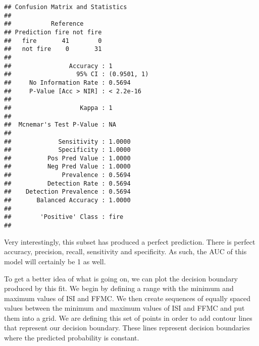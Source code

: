 \documentclass[
]{article}
\begin{document}
\begin{verbatim}
## Confusion Matrix and Statistics
## 
##           Reference
## Prediction fire not fire
##   fire       41        0
##   not fire    0       31
##                                      
##                Accuracy : 1          
##                  95% CI : (0.9501, 1)
##     No Information Rate : 0.5694     
##     P-Value [Acc > NIR] : < 2.2e-16  
##                                      
##                   Kappa : 1          
##                                      
##  Mcnemar's Test P-Value : NA         
##                                      
##             Sensitivity : 1.0000     
##             Specificity : 1.0000     
##          Pos Pred Value : 1.0000     
##          Neg Pred Value : 1.0000     
##              Prevalence : 0.5694     
##          Detection Rate : 0.5694     
##    Detection Prevalence : 0.5694     
##       Balanced Accuracy : 1.0000     
##                                      
##        'Positive' Class : fire       
## 
\end{verbatim}

Very interestingly, this subset has produced a perfect prediction. There
is perfect accuracy, precision, recall, sensitivity and specificity. As
such, the AUC of this model will certainly be 1 as well.

To get a better idea of what is going on, we can plot the decision
boundary produced by this fit. We begin by defining a range with the
minimum and maximum values of ISI and FFMC. We then create sequences of
equally spaced values between the minimum and maximum values of ISI and
FFMC and put them into a grid. We are defining this set of points in
order to add contour lines that represent our decision boundary. These
lines represent decision boundaries where the predicted probability is
constant.
\end{document}
